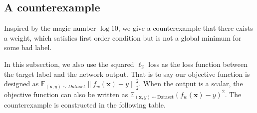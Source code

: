 \documentclass{article}
\theoremstyle{plain}
\theoremstyle{definition}
\newcommand{\norm}[1]{\left\lVert#1\right\rVert}
\begin{document}
\subsection{A counterexample}

Inspired by the magic number $\log 10$, we give a counterexample that there exists a weight, which satisfies first order condition but is not a global minimum for some bad label.

In this subsection, we also use the squared $\ell_2$ loss as the loss function between the target label and the network output. That is to say our objective function is designed as $\mathbb{E}_{(\mathbf x,y)\sim Dataset}\norm{f_w(\mathbf x)-y}_2^2$. When the output is a scalar, the objective function can also be written as $\mathbb{E}_{(\mathbf x,y)\sim\text{Dataset}}(f_w(\mathbf x)-y)^2$. The counterexample is constructed in the following table.%
\end{document}
